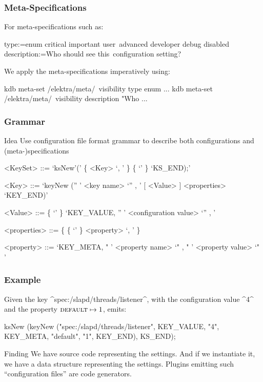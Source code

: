 \begin{frame}[fragile]
	\frametitle{Meta-Specifications}
	For meta-specifications such as:

	\small
	\begin{code}
	[visibility]
	type:=enum critical important user\
	      advanced developer debug disabled
	description:=Who should see this\
	     configuration setting?
	\end{code}

	We apply the meta-specifications imperatively using:

	\begin{code}[language=bash,morekeywords={meta-set}]
	kdb meta-set /elektra/meta/\
		visibility type enum ...
	kdb meta-set /elektra/meta/\
		visibility description "Who ...
	\end{code}
\end{frame}


\begin{frame}[fragile]
	\frametitle{Grammar}
	\begin{alertblock}{Idea}
	Use configuration file format grammar to describe both configurations and (meta-)specifications
	\end{alertblock}

	\begin{grammar}
	<KeySet> ::= \lq ksNew'\WhiteSpace(' \{ <Key> \lq , \LineBreak'  \}  \{ \lq\WhiteSpace' \} \lq KS\_END);'

	<Key> ::= \lq keyNew \WhiteSpace ('' ' <key name> \lq ''  , \LineBreak' [ <Value> ] <properties> \lq KEY_END)'

	<Value> ::=  \{ \lq\WhiteSpace' \} \lq KEY\_VALUE, \WhiteSpace '' ' <configuration value> \lq ''  , \LineBreak'

	<properties> ::= \{ \{ \lq\WhiteSpace' \} <property> \lq , \LineBreak' \}

	<property> ::=  \lq KEY\_META, \WhiteSpace " ' <property name> \lq "  , \WhiteSpace " ' <property value> \lq " '
	\end{grammar}
\end{frame}

\begin{frame}[fragile]
	\frametitle{Example}
	\begin{example}
	Given the key ^spec:/slapd/threads/listener^, with the configuration value ^4^ and the property ${\textsc{default}} \mapsto 1$, \elektra{} emits:

	\begin{code}[gobble=4,language=Cpp]
	ksNew (keyNew ("spec:/slapd/threads/listener",
		       KEY_VALUE, "4",
		       KEY_META, "default", "1",
		       KEY_END),
	       KS_END);
	\end{code}
	\vspace{-1em}
	\end{example}

	\pause
	\begin{alertblock}{Finding}
	We have source code representing the settings.
	And if we instantiate it, we have a data structure representing the settings.
	Plugins emitting such ``configuration files'' are code generators.
	\end{alertblock}
\end{frame}

